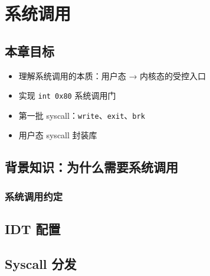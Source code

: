 \chapter{系统调用}
\label{ch:syscall}

\section{本章目标}

\begin{itemize}
  \item 理解系统调用的本质：用户态 → 内核态的受控入口
  \item 实现 \texttt{int 0x80} 系统调用门
  \item 第一批 syscall：\texttt{write}、\texttt{exit}、\texttt{brk}
  \item 用户态 syscall 封装库
\end{itemize}

\section{背景知识：为什么需要系统调用}


\subsection{系统调用约定}


\section{IDT 配置}


\section{Syscall 分发}


